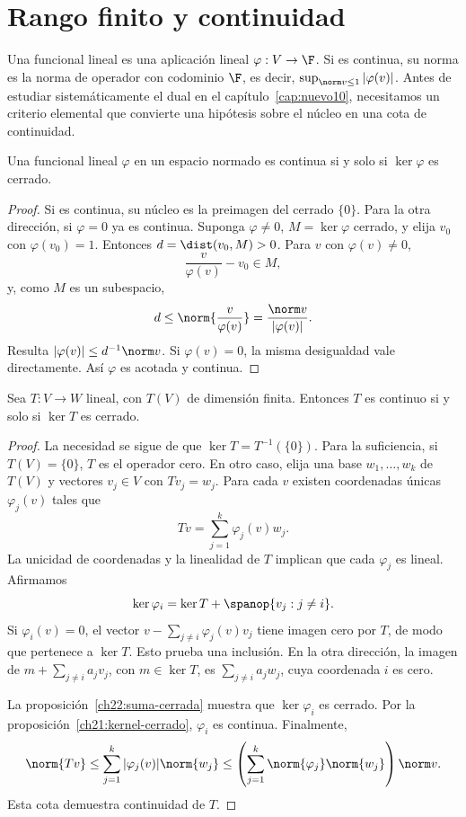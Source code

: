 \section{Rango finito y continuidad}\label{sec:nuevo09:rango-finito}

Una funcional lineal es una aplicación lineal $\varphi:V\to\F$. Si es continua, su norma es la norma de operador con codominio $\F$, es decir, $\sup_{\norm v\leq1}|\varphi(v)|$. Antes de estudiar sistemáticamente el dual en el capítulo~\ref{cap:nuevo10}, necesitamos un criterio elemental que convierte una hipótesis sobre el núcleo en una cota de continuidad.

\begin{proposicion}\label{ch21:kernel-cerrado}
Una funcional lineal $\varphi$ en un espacio normado es continua si y solo si $\ker\varphi$ es cerrado.
\end{proposicion}
\begin{proof}
Si es continua, su núcleo es la preimagen del cerrado $\{0\}$. Para la otra dirección, si $\varphi=0$ ya es continua. Suponga $\varphi\ne0$, $M=\ker\varphi$ cerrado, y elija $v_0$ con $\varphi(v_0)=1$. Entonces $d=\dist(v_0,M)>0$. Para $v$ con $\varphi(v)\ne0$,
\[
 \frac{v}{\varphi(v)}-v_0\in M,
\]
y, como $M$ es un subespacio,
\[
 d\leq\norm{\frac v{\varphi(v)}}=\frac{\norm v}{|\varphi(v)|}.
\]
Resulta $|\varphi(v)|\leq d^{-1}\norm v$. Si $\varphi(v)=0$, la misma desigualdad vale directamente. Así $\varphi$ es acotada y continua.
\end{proof}

\begin{teorema}\label{ch22:rango-finito-kernel}
Sea $T:V\to W$ lineal, con $T(V)$ de dimensión finita. Entonces $T$ es continuo si y solo si $\ker T$ es cerrado.
\end{teorema}
\begin{proof}
La necesidad se sigue de que $\ker T=T^{-1}(\{0\})$. Para la suficiencia, si $T(V)=\{0\}$, $T$ es el operador cero. En otro caso, elija una base $w_1,\ldots,w_k$ de $T(V)$ y vectores $v_j\in V$ con $Tv_j=w_j$. Para cada $v$ existen coordenadas únicas $\varphi_j(v)$ tales que
\[
 Tv=\sum_{j=1}^k\varphi_j(v)w_j.
\]
La unicidad de coordenadas y la linealidad de $T$ implican que cada $\varphi_j$ es lineal. Afirmamos
\[
 \ker\varphi_i=\ker T+\spanop\{v_j:j\ne i\}.
\]
Si $\varphi_i(v)=0$, el vector $v-\sum_{j\ne i}\varphi_j(v)v_j$ tiene imagen cero por $T$, de modo que pertenece a $\ker T$. Esto prueba una inclusión. En la otra dirección, la imagen de $m+\sum_{j\ne i}a_jv_j$, con $m\in\ker T$, es $\sum_{j\ne i}a_jw_j$, cuya coordenada $i$ es cero.

La proposición~\ref{ch22:suma-cerrada} muestra que $\ker\varphi_i$ es cerrado. Por la proposición~\ref{ch21:kernel-cerrado}, $\varphi_i$ es continua. Finalmente,
\[
 \norm{Tv}\leq\sum_{j=1}^k|\varphi_j(v)|\norm{w_j}
 \leq\left(\sum_{j=1}^k\norm{\varphi_j}\norm{w_j}\right)\norm v.
\]
Esta cota demuestra continuidad de $T$.
\end{proof}


